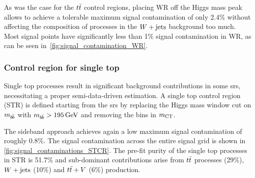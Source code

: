 As was the case for the $t\bar{t}$ control regions, placing WR off the Higgs mass peak allows to achieve a tolerable maximum signal contamination of only 2.4\% without affecting the composition of processes in the $W+\mathrm{jets}$ background too much.
Most signal points have significantly less than 1\% signal contamination in WR, as can be seen in~\cref{fig:signal_contamination_WR}. 


\subsubsection{Control region for single top}

Single top processes result in significant background contributions in some \glspl{sr}, necessitating a proper semi-data-driven estimation.
A single top control region (STR) is defined starting from the \glspl{sr} by replacing the Higgs mass window cut on $m_{b\hspace{-0.06em}\bar{b}}$ with $\mbb > \SI{195}{\GeV}$ and removing the bins in $m_{\textrm{CT}}$. 

The sideband approach achieves again a low maximum signal contamination of roughly 0.8\%.
The signal contamination across the entire signal grid is shown in \cref{fig:signal_contaminations_STCR}.
The pre-fit purity of the single top processes in STR is 51.7\% and sub-dominant contributions arise from $t\bar{t}$ processes (29\%), $W+\mathrm{jets}$ (10\%) and $t\bar{t}+V$ (6\%) production. 

